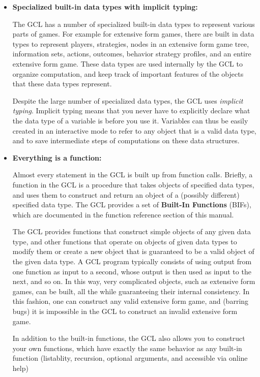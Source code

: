 \begin{itemize}
\item {\bf Specialized built-in data types with implicit typing: }

The GCL has a number of specialized built-in data types to represent
various parts of games. For example for extensive form games, there
are built in data types to represent players, strategies, nodes in an
extensive form game tree, information sets, actions, outcomes,
behavior strategy profiles, and an entire extensive form game.
These data types are used internally by the GCL to organize
computation, and keep track of important features of the objects that
these data types represent.

Despite the large number of specialized data types, the GCL uses {\it
implicit typing}.  Implicit typing means that you never have to
explicitly declare what the data type of a variable is before you use
it.  Variables can thus be easily created in an interactive mode to
refer to any object that is a valid data type, and to save
intermediate steps of computations on these data structures.

\item {\bf Everything is a function: }

Almost every statement in the GCL is built up from function calls.
Briefly, a function in the GCL is a procedure that takes objects of
specified data types, and uses them to construct and return an object
of a (possibly different) specified data type.  The GCL provides a set
of {\bf Built-In Functions} (BIFs), which are documented in the
function reference section of this manual.  

The GCL provides functions that construct simple objects of any given
data type, and other functions that operate on objects of given data
types to modify them or create a new object that is guaranteed to be a
valid object of the given data type.  A GCL program typically consists
of using output from one function as input to a second, whose output
is then used as input to the next, and so on.  In this way, very
complicated objects, such as extensive form games, can be built, all
the while guaranteeing their internal consistency.  In this fashion,
one can construct any valid extensive form game, and (barring bugs) it
is impossible in the GCL to construct an invalid extensive form game.

In addition to the built-in functions, the GCL also allows you to
construct your own functions, which have exactly the same behavior as
any built-in function (listablity, recursion, optional arguments,
and accessible via online help)


\end{itemize}
